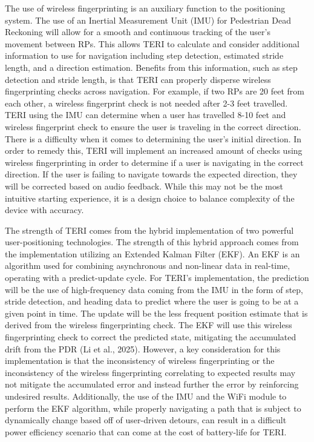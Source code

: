 \documentclass{article}
\begin{document}
The use of wireless fingerprinting is an auxiliary function to the positioning system. The use of an Inertial Measurement Unit (IMU) for Pedestrian Dead Reckoning will allow for a smooth and continuous tracking of the user's movement between RPs. This allows TERI to calculate and consider additional information to use for navigation including step detection, estimated stride length, and a direction estimation. Benefits from this information, such as step detection and stride length, is that TERI can properly disperse wireless fingerprinting checks across navigation. For example, if two RPs are 20 feet from each other, a wireless fingerprint check is not needed after 2-3 feet travelled. TERI using the IMU can determine when a user has travelled 8-10 feet and wireless fingerprint check to ensure the user is traveling in the correct direction. There is a difficulty when it comes to determining the user's initial direction. In order to remedy this, TERI will implement an increased amount of checks using wireless fingerprinting in order to determine if a user is navigating in the correct direction. If the user is failing to navigate towards the expected direction, they will be corrected based on audio feedback. While this may not be the most intuitive starting experience, it is a design choice to balance complexity of the device with accuracy.

The strength of TERI comes from the hybrid implementation of two powerful user-positioning technologies. The strength of this hybrid approach comes from the implementation utilizing an Extended Kalman Filter (EKF). An EKF is an algorithm used for combining asynchronous and non-linear data in real-time, operating with a predict-update cycle. For TERI's implementation, the prediction will be the use of high-frequency data coming from the IMU in the form of step, stride detection, and heading data to predict where the user is going to be at a given point in time. The update will be the less frequent position estimate that is derived from the wireless fingerprinting check. The EKF will use this wireless fingerprinting check to correct the predicted state, mitigating the accumulated drift from the PDR (Li et al., 2025). However, a key consideration for this implementation is that the inconsistency of wireless fingerprinting or the inconsistency of the wireless fingerprinting correlating to expected results may not mitigate the accumulated error and instead further the error by reinforcing undesired results. Additionally, the use of the IMU and the WiFi module to perform the EKF algorithm, while properly navigating a path that is subject to dynamically change based off of user-driven detours, can result in a difficult power efficiency scenario that can come at the cost of battery-life for TERI.
\end{document}
